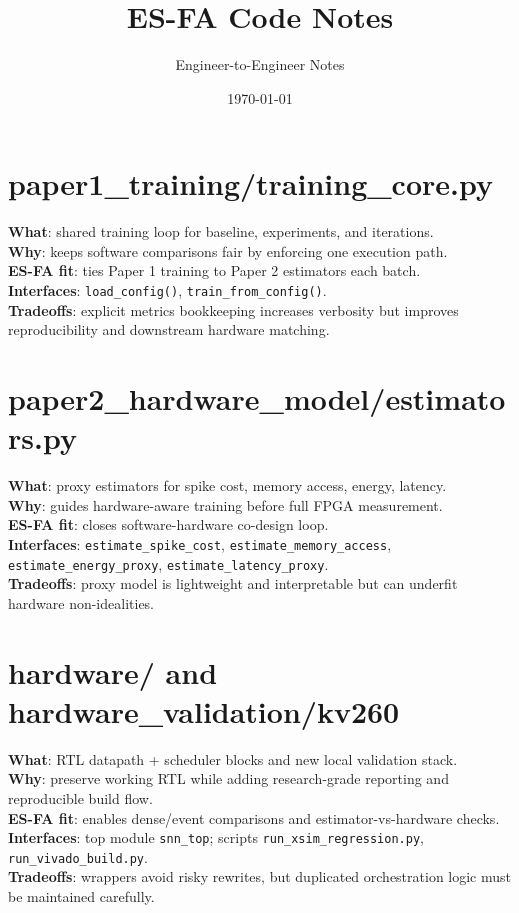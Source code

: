 \documentclass[11pt]{article}
\title{ES-FA Code Notes}
\author{Engineer-to-Engineer Notes}
\date{\today}
\begin{document}
\maketitle

\section{paper1\_training/training\_core.py}
\textbf{What}: shared training loop for baseline, experiments, and iterations.\\
\textbf{Why}: keeps software comparisons fair by enforcing one execution path.\\
\textbf{ES-FA fit}: ties Paper 1 training to Paper 2 estimators each batch.\\
\textbf{Interfaces}: \texttt{load\_config()}, \texttt{train\_from\_config()}.\\
\textbf{Tradeoffs}: explicit metrics bookkeeping increases verbosity but improves reproducibility and downstream hardware matching.

\section{paper2\_hardware\_model/estimators.py}
\textbf{What}: proxy estimators for spike cost, memory access, energy, latency.\\
\textbf{Why}: guides hardware-aware training before full FPGA measurement.\\
\textbf{ES-FA fit}: closes software-hardware co-design loop.\\
\textbf{Interfaces}: \texttt{estimate\_spike\_cost}, \texttt{estimate\_memory\_access}, \texttt{estimate\_energy\_proxy}, \texttt{estimate\_latency\_proxy}.\\
\textbf{Tradeoffs}: proxy model is lightweight and interpretable but can underfit hardware non-idealities.

\section{hardware/ and hardware\_validation/kv260}
\textbf{What}: RTL datapath + scheduler blocks and new local validation stack.\\
\textbf{Why}: preserve working RTL while adding research-grade reporting and reproducible build flow.\\
\textbf{ES-FA fit}: enables dense/event comparisons and estimator-vs-hardware checks.\\
\textbf{Interfaces}: top module \texttt{snn\_top}; scripts \texttt{run\_xsim\_regression.py}, \texttt{run\_vivado\_build.py}.\\
\textbf{Tradeoffs}: wrappers avoid risky rewrites, but duplicated orchestration logic must be maintained carefully.
\end{document}
